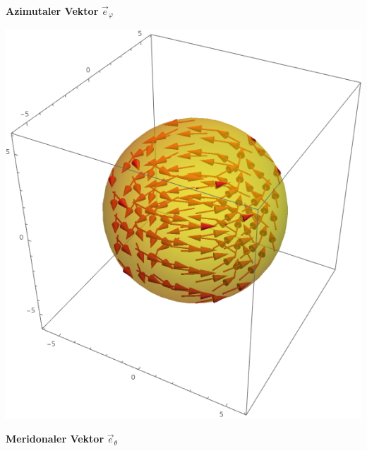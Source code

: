 \begin{minipage}[t]{0.48\linewidth}



	\begin{center}

		\textbf{Azimutaler Vektor} $\vec{e}_\varphi$

	\end{center}

	\begin{center}

		\includegraphics[scale=0.4]{spherical_phi.png}

	\end{center}

\end{minipage}


\begin{center}

	\textbf{Meridonaler Vektor} $\vec{e}_\theta$

\end{center}

